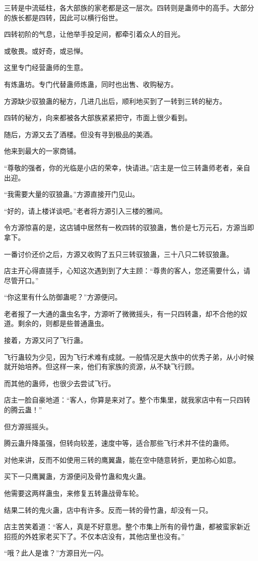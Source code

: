 \begin{this_body}
三转是中流砥柱，各大部族的家老都是这一层次。四转则是蛊师中的高手。大部分的族长都是四转，因此可以横行俗世。

四转初阶的气息，让他举手投足间，都牵引着众人的目光。

或敬畏。或好奇，或忌惮。

这里专门经营蛊师的生意。

有炼蛊坊。专门代替蛊师炼蛊，同时也出售、收购秘方。

方源缺少驭狼蛊的秘方，几进几出后，顺利地买到了一转到三转的秘方。

四转的秘方，向来都被各大部族紧紧把守，市面上很少看到。

随后，方源又去了酒楼。但没有寻到极品的美酒。

他来到最大的一家商铺。

“尊敬的强者，你的光临是小店的荣幸，快请进。”店主是一位三转蛊师老者，亲自出迎。

“我需要大量的驭狼蛊。”方源直接开门见山。

“好的，请上楼详谈吧。”老者将方源引入三楼的雅间。

令方源惊喜的是，这店铺中居然有一枚四转的驭狼蛊，售价是七万元石，方源当即拿下。

一番讨价还价之后，方源又收购了五只三转驭狼蛊，三十八只二转驭狼蛊。

店主开心得直搓手，心知这次遇到到了大主顾：“尊贵的客人，您还需要什么，请尽管开口。”

“你这里有什么防御蛊呢？”方源便问。

老者报了一大通的蛊虫名字，方源听了微微摇头，有一只四转蛊，却不合他的奴道。剩余的，则都是些普通蛊虫。

接着，方源又问了飞行蛊。

飞行蛊较为少见，因为飞行术难有成就。一般情况是大族中的优秀子弟，从小时候就开始培养。但这样一来，他们有家族的资源，从不缺飞行顾。

而其他的蛊师，也很少去尝试飞行。

店主一脸自豪地道：“客人，你算是来对了。整个市集里，就我家店中有一只四转的腾云蛊！”

但方源摇摇头。

腾云蛊升降虽强，但转向较差，速度中等，适合那些飞行术并不佳的蛊师。

对他来讲，反而不如使用三转的鹰翼蛊，能在空中随意转折，更加称心如意。

买下一只鹰翼蛊，方源便问及骨竹蛊和鬼火蛊。

他需要这两样蛊虫，来修复五转蛊战骨车轮。

结果二转的鬼火蛊，店中有许多。反而一转的骨竹蛊，却没有一只。

店主苦笑着道：“客人，真是不好意思。整个市集上所有的骨竹蛊，都被蛮家新近招揽的外姓家老买下了。不仅本店没有，其他店里也没有。”

“哦？此人是谁？”方源目光一闪。

\end{this_body}

